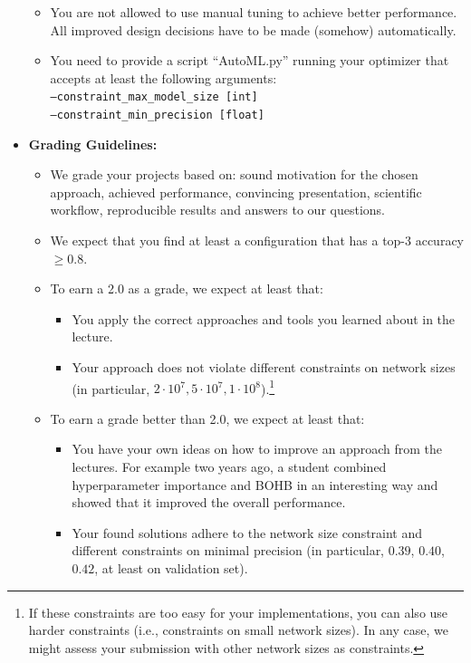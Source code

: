 \documentclass[10pt,a4paper]{article}
\begin{document}
\begin{itemize}
\begin{itemize}
			  \item You are not allowed to use manual tuning to achieve better performance. All improved design decisions have to be made (somehow) automatically.
			  \item You need to provide a script ``AutoML.py'' running your optimizer that accepts at least the following arguments:\\
			  \texttt{--constraint\_max\_model\_size [int]}\\
			  \texttt{--constraint\_min\_precision [float]}
			\end{itemize}
			\item \textbf{Grading Guidelines:}
			\begin{itemize}
			  \item We grade your projects based on: sound motivation for the chosen approach, achieved performance, convincing presentation, scientific workflow, reproducible results and answers to our questions.
			  \item We expect that you find at least a configuration that has a top-3 accuracy $\geq 0.8$.
			  \item To earn a 2.0 as a grade, we expect at least that:
			  \begin{itemize}
			  	\item You apply the correct approaches and tools you learned about in the lecture.
			  	\item Your approach does not violate different constraints on network sizes\\ (in particular, $2\cdot10^7, 5\cdot10^7, 1\cdot10^8$).\footnote{If these constraints are too easy for your implementations, you can also use harder constraints (i.e., constraints on small network sizes). In any case, we might assess your submission with other network sizes as constraints.}
			  \end{itemize}
			  \item To earn a grade better than 2.0, we expect at least that:
			  \begin{itemize}
			  	\item You have your own ideas on how to improve an approach from the lectures. For example two years ago, a student combined hyperparameter importance and BOHB in an interesting way and showed that it improved the overall performance.
			  	\item Your found solutions adhere to the network size constraint and different constraints on minimal precision (in particular, $0.39$, $0.40$, $0.42$, at least on validation set).

\end{itemize}
\end{itemize}
\end{itemize}
\end{document}
